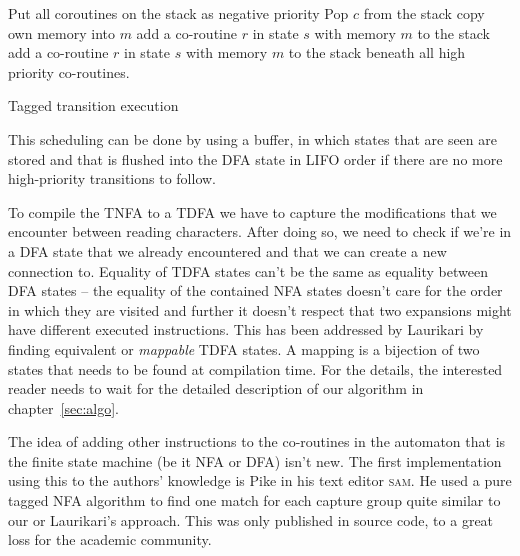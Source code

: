 \documentclass[11pt,a4paper,twoside,openright]{Thesis}
\theoremstyle{definition}
\begin{document}
\begin{algorithm*}
  \begin{algorithmic}
    \State Put all coroutines on the stack as negative priority
      \State Pop $c$ from the stack
          \State copy own memory into $m$
          \State {}
        \EndIf
          \State add a co-routine $r$ in state $s$ with memory $m$ to the stack
        \Else
          \State add a co-routine $r$ in state $s$ with memory $m$ to the 
          stack beneath all high priority co-routines.
        \EndIf
      \EndFor
    \EndWhile
  \EndFunction
  \end{algorithmic}
  \caption{\label{alg:coroutine-tagged}Tagged transition execution}
\end{algorithm*}

This scheduling can be done by using a buffer, in which states that are seen 
are stored and that is flushed into the DFA state in LIFO order if there are no
more high-priority transitions to follow.

To compile the TNFA to a TDFA we have to capture the modifications that we 
encounter between reading characters. After doing so, we need to check if 
we're in a DFA state that we already encountered and that we can create a new 
connection to. Equality of TDFA states can't be the same as equality between 
DFA states -- the equality of the contained NFA states doesn't care for the 
order in which they are visited and further it doesn't respect that two 
expansions might have different executed instructions. This has been addressed
by Laurikari\cite{Laur00a} by finding equivalent or \emph{mappable} TDFA
states. A mapping is a bijection of two states that needs to be found at
compilation time. For the details, the interested reader needs to wait for the
detailed description of our algorithm in chapter~\ref{sec:algo}.

The idea of adding other instructions to the co-routines in the automaton
that is the finite state machine (be it NFA or DFA) isn't new. The first
implementation using this to the authors' knowledge is Pike\cite{Pike87a} in
his text editor \textsc{sam}. He used a pure tagged NFA algorithm to find one
match for each capture group quite similar to our or Laurikari's approach. This
was only published in source code, to a great loss for the academic community.
\end{document}
